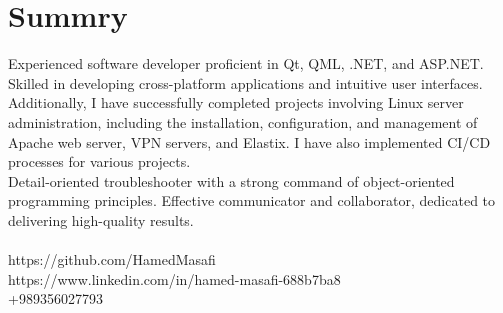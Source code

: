 \section{Summry}
Experienced software developer proficient in Qt, QML, .NET, and ASP.NET. Skilled in developing cross-platform applications and intuitive user interfaces. Additionally, I have successfully completed projects involving Linux server administration, including the installation, configuration, and management of Apache web server, VPN servers, and Elastix. I have also implemented CI/CD processes for various projects.
\\
Detail-oriented troubleshooter with a strong command of object-oriented programming principles. Effective communicator and collaborator, dedicated to delivering high-quality results.
\\
\\
\faGithub \tab https://github.com/HamedMasafi
\\
\faLinkedin \tab https://www.linkedin.com/in/hamed-masafi-688b7ba8
\\
\faPhone \tab +989356027793
